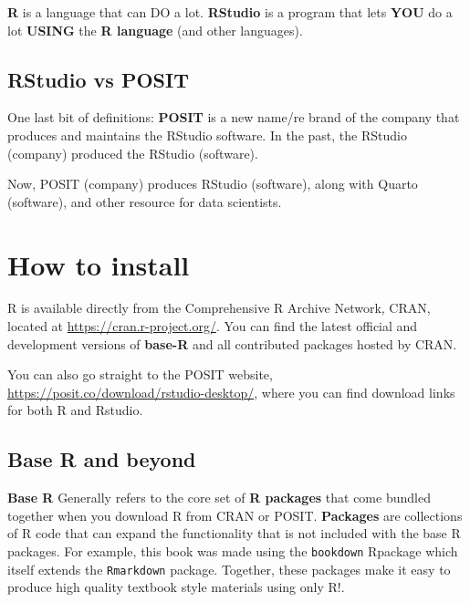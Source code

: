 \documentclass[
]{book}
\begin{document}
\textbf{R} is a language that can DO a lot.
\textbf{RStudio} is a program that lets \textbf{YOU} do a lot \textbf{USING} the \textbf{R language} (and other languages).

\hypertarget{rstudio-vs-posit}{%
\subsection*{RStudio vs POSIT}\label{rstudio-vs-posit}}

One last bit of definitions: \textbf{POSIT} is a new name/re brand of the company that produces and maintains the RStudio software. In the past, the RStudio (company) produced the RStudio (software).

Now, POSIT (company) produces RStudio (software), along with Quarto (software), and other resource for data scientists.

\hypertarget{how-to-install}{%
\section*{How to install}\label{how-to-install}}

R is available directly from the Comprehensive R Archive Network, CRAN, located at \url{https://cran.r-project.org/}. You can find the latest official and development versions of \textbf{base-R} and all contributed packages hosted by CRAN.

You can also go straight to the POSIT website, \url{https://posit.co/download/rstudio-desktop/}, where you can find download links for both R and Rstudio.

\hypertarget{base-r-and-beyond}{%
\subsection*{Base R and beyond}\label{base-r-and-beyond}}

\textbf{Base R} Generally refers to the core set of \textbf{R packages} that come bundled together when you download R from CRAN or POSIT. \textbf{Packages} are collections of R code that can expand the functionality that is not included with the base R packages. For example, this book was made using the \texttt{bookdown} Rpackage which itself extends the \texttt{Rmarkdown} package. Together, these packages make it easy to produce high quality textbook style materials using only R!.
\end{document}
